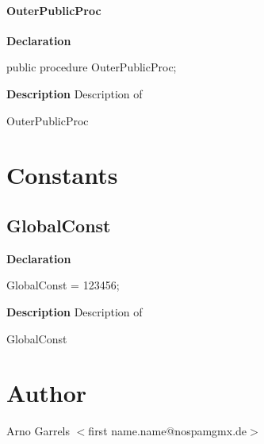 \documentclass{report}
\newif\ifpdf
\begin{document}
\paragraph*{OuterPublicProc}\hspace*{\fill}

\label{ok_nested_types.TOuterClass-OuterPublicProc}
\begin{list}{}{
\setlength{\itemindent}{0cm}
\setlength{\listparindent}{0cm}
\setlength{\leftmargin}{\evensidemargin}
\addtolength{\leftmargin}{\tmplength}
\settowidth{\labelsep}{X}
\addtolength{\leftmargin}{\labelsep}
\setlength{\labelwidth}{\tmplength}
}
\item[\textbf{Declaration}\hfill]
\ifpdf
\begin{flushleft}
\fi
\begin{ttfamily}
public procedure OuterPublicProc;\end{ttfamily}

\ifpdf
\end{flushleft}
\fi

\par
\item[\textbf{Description}]
Description of \begin{ttfamily}OuterPublicProc\end{ttfamily}

\end{list}
\section{Constants}
\ifpdf
\subsection*{\large{\textbf{GlobalConst}}\normalsize\hspace{1ex}\hrulefill}
\else
\subsection*{GlobalConst}
\fi
\label{ok_nested_types-GlobalConst}
\begin{list}{}{
\setlength{\itemindent}{0cm}
\setlength{\listparindent}{0cm}
\setlength{\leftmargin}{\evensidemargin}
\addtolength{\leftmargin}{\tmplength}
\settowidth{\labelsep}{X}
\addtolength{\leftmargin}{\labelsep}
\setlength{\labelwidth}{\tmplength}
}
\item[\textbf{Declaration}\hfill]
\ifpdf
\begin{flushleft}
\fi
\begin{ttfamily}
GlobalConst = 123456;\end{ttfamily}

\ifpdf
\end{flushleft}
\fi

\par
\item[\textbf{Description}]
Description of \begin{ttfamily}GlobalConst\end{ttfamily}

\end{list}
\section{Author}
\par
Arno Garrels {$<$}first name.name@nospamgmx.de{$>$}
\end{document}
